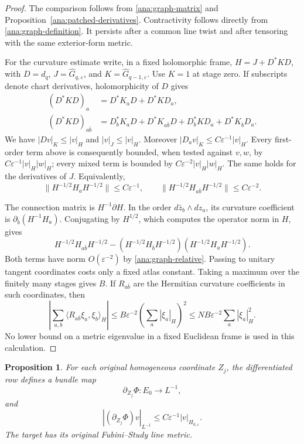 \documentclass[11pt,reqno]{amsart}
\numberwithin{equation}{section}
\newtheorem{proposition}[theorem]{Proposition}
\theoremstyle{definition}
\theoremstyle{remark}
\begin{document}
\begin{proof}
The comparison follows from \eqref{ana:graph-matrix} and
Proposition~\ref{ana:patched-derivatives}.  Contractivity follows
directly from \eqref{ana:graph-definition}.  It persists after a
common line twist and after tensoring with the same exterior-form
metric.

For the curvature estimate write, in a fixed holomorphic frame,
$H=J+D^*KD$, with $D=d_q$,
$J=\widehat G_{q,\varepsilon}$, and
$K=\widehat G_{q-1,\varepsilon}$.  Use $K=1$ at stage zero.
If subscripts denote chart derivatives, holomorphicity of $D$ gives
\begin{align*}
 (D^*KD)_a&=D^*K_aD+D^*KD_a,\\
 (D^*KD)_{a\bar b}
 &=D_b^*K_aD+D^*K_{a\bar b}D
   +D_b^*KD_a+D^*K_{\bar b}D_a.
\end{align*}
We have $|Dv|_K\leq|v|_H$ and $|v|_J\leq|v|_H$.
Moreover $|D_av|_K\leq C\varepsilon^{-1}|v|_H$.
Every first-order term above is consequently bounded, when tested
against $v,w$, by $C\varepsilon^{-1}|v|_H|w|_H$; every mixed term
is bounded by $C\varepsilon^{-2}|v|_H|w|_H$.
The same holds for the derivatives of $J$.  Equivalently,
\begin{equation}\label{ana:graph-relative}
 \|H^{-1/2}H_aH^{-1/2}\|\leq C\varepsilon^{-1},
 \qquad
 \|H^{-1/2}H_{a\bar b}H^{-1/2}\|
 \leq C\varepsilon^{-2}.
\end{equation}

The connection matrix is $H^{-1}\partial H$.  In the order
$d\bar z_b\wedge dz_a$, its curvature coefficient is
$\partial_{\bar b}(H^{-1}H_a)$.  Conjugating by $H^{1/2}$, which
computes the operator norm in $H$, gives
\[
 H^{-1/2}H_{a\bar b}H^{-1/2}
 -(H^{-1/2}H_{\bar b}H^{-1/2})
  (H^{-1/2}H_aH^{-1/2}).
\]
Both terms have norm $O(\varepsilon^{-2})$ by
\eqref{ana:graph-relative}.  Passing to unitary tangent coordinates
costs only a fixed atlas constant.  Taking a maximum over the finitely
many stages gives $B$.  If $R_{a\bar b}$ are the Hermitian curvature
coefficients in such coordinates, then
\[
 \left|\sum_{a,b}\langle R_{a\bar b}\xi_a,\xi_b\rangle_H\right|
 \leq B\varepsilon^{-2}\left(\sum_a|\xi_a|_H\right)^2
 \leq NB\varepsilon^{-2}\sum_a|\xi_a|_H^2.
\]
No lower bound on a metric eigenvalue in a fixed Euclidean frame is
used in this calculation.
\end{proof}

\begin{proposition}\label{ana:homogeneous-derivative}
For each original homogeneous coordinate $Z_j$, the differentiated
row defines a bundle map
\[
 \partial_{Z_j}\Phi:E_0\longrightarrow L^{-1},
\]
and
\begin{equation}\label{ana:row-bound}
 |(\partial_{Z_j}\Phi)v|_{L^{-1}}
 \leq C\varepsilon^{-1}|v|_{H_{0,\varepsilon}}.
\end{equation}
The target has its original Fubini--Study line metric.
\end{proposition}
\end{document}
